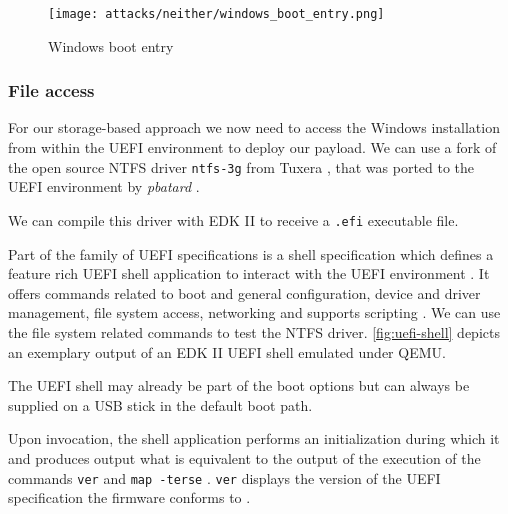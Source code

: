 \begin{figure}[htb]
    \centering
    \texttt{[image: attacks/neither/windows\_boot\_entry.png]}
    \caption{Windows boot entry }
    \label{fig:windows-boot-entry}
\end{figure}

\subsubsection{File access}

For our storage-based approach we now need to access the Windows installation from within the \ac{UEFI} environment to deploy our payload.
We can use a fork of the open source \ac{NTFS} driver \lstinline{ntfs-3g} from Tuxera \cite{ntfs-3g}, that was ported to the \ac{UEFI} environment by \emph{pbatard} \cite{ntfs-3g-uefi}.

We can compile this driver with \ac{EDK} II to receive a \lstinline{.efi} executable file.

Part of the family of \ac{UEFI} specifications is a shell specification which defines a feature rich \ac{UEFI} shell application to interact with the \ac{UEFI} environment \cite[1.1]{uefi-shell-spec}.
It offers commands related to boot and general configuration, device and driver management, file system access, networking \cite[5.1]{uefi-shell-spec} and supports scripting \cite[4]{uefi-shell-spec}.
We can use the file system related commands to test the \ac{NTFS} driver.
\autoref{fig:uefi-shell} depicts an exemplary output of an \ac{EDK} II \ac{UEFI} shell emulated under QEMU.

The \ac{UEFI} shell may already be part of the boot options but can always be supplied on a \ac{USB} stick in the default boot path.

Upon invocation, the shell application performs an initialization during which it  and produces output what is equivalent to the output of the execution of the commands \lstinline{ver} and \lstinline{map -terse} \cite[3.3 Initialization]{uefi-shell-spec}.
\lstinline{ver} displays the version of the \ac{UEFI} specification the firmware conforms to \cite[5.3 Shell Commands]{uefi-shell-spec}.


